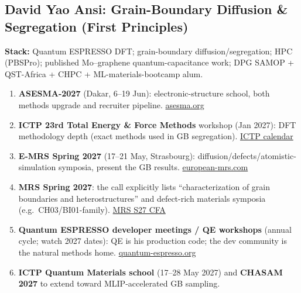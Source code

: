 \documentclass[11pt,a4paper]{article}
\begin{document}
\subsection{David Yao Ansi: Grain-Boundary Diffusion \& Segregation (First Principles)}
\textbf{Stack:} Quantum ESPRESSO DFT; grain-boundary diffusion/segregation; HPC (PBSPro); published Mo--graphene quantum-capacitance work; DPG SAMOP + QST-Africa + CHPC + ML-materials-bootcamp alum.
\begin{enumerate}[leftmargin=1.6em]
  \item \textbf{ASESMA-2027} (Dakar, 6--19 Jun): electronic-structure school, both methods upgrade and recruiter pipeline. \href{https://asesma.org/programs}{asesma.org}
  \item \textbf{ICTP 23rd Total Energy \& Force Methods} workshop (Jan 2027): DFT methodology depth (exact methods used in GB segregation). \href{https://www.ictp.it/home/scientific-calendar}{ICTP calendar}
  \item \textbf{E-MRS Spring 2027} (17--21 May, Strasbourg): diffusion/defects/atomistic-simulation symposia, present the GB results. \href{https://www.european-mrs.com/meetings/2027-spring-meeting-exhibit}{european-mrs.com}
  \item \textbf{MRS Spring 2027}: the call explicitly lists ``characterization of grain boundaries and heterostructures'' and defect-rich materials symposia (e.g.\ CH03/BI01-family). \href{https://www.mrs.org/docs/default-source/meetings-events/spring-meetings/2027/s27-call-for-abstracts.pdf}{MRS S27 CFA}
  \item \textbf{Quantum ESPRESSO developer meetings / QE workshops} (annual cycle; watch 2027 dates): QE is his production code; the dev community is the natural methods home. \href{https://www.quantum-espresso.org/}{quantum-espresso.org}
  \item \textbf{ICTP Quantum Materials school} (17--28 May 2027) and \textbf{CHASAM 2027} to extend toward MLIP-accelerated GB sampling.
\end{enumerate}
\end{document}
